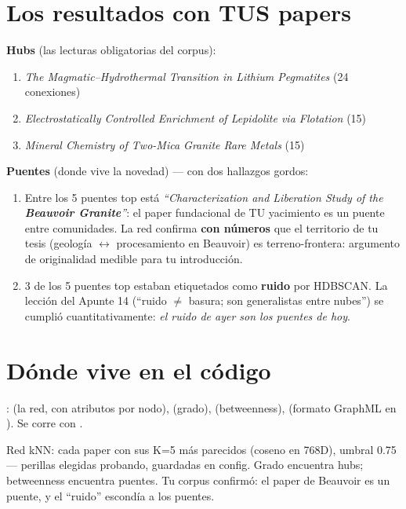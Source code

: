 \documentclass[11pt,a4paper]{article}
\begin{document}
\section{Los resultados con TUS papers}

\textbf{Hubs} (las lecturas obligatorias del corpus):
\begin{enumerate}
  \item \emph{The Magmatic--Hydrothermal Transition in Lithium Pegmatites} (24 conexiones)
  \item \emph{Electrostatically Controlled Enrichment of Lepidolite via Flotation} (15)
  \item \emph{Mineral Chemistry of Two-Mica Granite Rare Metals} (15)
\end{enumerate}

\textbf{Puentes} (donde vive la novedad) — con dos hallazgos gordos:
\begin{enumerate}
  \item Entre los 5 puentes top está \emph{``Characterization and Liberation Study of the
        \textbf{Beauvoir Granite}''}: el paper fundacional de TU yacimiento es un puente
        entre comunidades. La red confirma \textbf{con números} que el territorio de tu
        tesis (geología $\leftrightarrow$ procesamiento en Beauvoir) es terreno-frontera:
        argumento de originalidad medible para tu introducción.
  \item 3 de los 5 puentes top estaban etiquetados como \textbf{ruido} por HDBSCAN. La
        lección del Apunte 14 (``ruido $\neq$ basura; son generalistas entre nubes'') se
        cumplió cuantitativamente: \emph{el ruido de ayer son los puentes de hoy}.
\end{enumerate}

\section{Dónde vive en el código}

:  (la red, con atributos por
nodo),  (grado),  (betweenness),
 (formato GraphML en ).
Se corre con .

\begin{resumen}
Red kNN: cada paper con sus K=5 más parecidos (coseno en 768D), umbral 0.75 — perillas
elegidas probando, guardadas en config. Grado encuentra hubs; betweenness encuentra puentes.
Tu corpus confirmó: el paper de Beauvoir es un puente, y el ``ruido'' escondía a los puentes.
\end{resumen}
\clearpage
{}
{}
\end{document}
